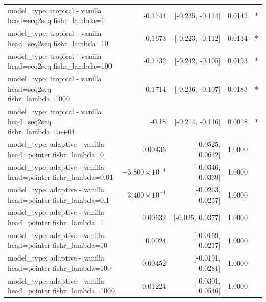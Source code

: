 \documentclass[10pt]{article}
\makeatletter
\newcommand{\stackcell}[1]{\begin{tabular}[t]{@{}l@{}}#1\end{tabular}}
\makeatother
\begin{document}
{\begin{longtable}{lrrrl}
\stackcell{model\_type: tropical - vanilla\\\footnotesize head=seq2seq fishr\_lambda=1 } & -0.1744 & [-0.235, -0.114] & 0.0142 & *\\
\stackcell{model\_type: tropical - vanilla\\\footnotesize head=seq2seq fishr\_lambda=10 } & -0.1673 & [-0.223, -0.112] & 0.0134 & *\\
\stackcell{model\_type: tropical - vanilla\\\footnotesize head=seq2seq fishr\_lambda=100 } & -0.1732 & [-0.242, -0.105] & 0.0193 & *\\
\stackcell{model\_type: tropical - vanilla\\\footnotesize head=seq2seq fishr\_lambda=1000 } & -0.1714 & [-0.236, -0.107] & 0.0183 & *\\
\stackcell{model\_type: tropical - vanilla\\\footnotesize head=seq2seq fishr\_lambda=1e+04 } & -0.18 & [-0.214, -0.146] & 0.0018 & *\\
\stackcell{model\_type: adaptive - vanilla\\\footnotesize head=pointer fishr\_lambda=0 } & 0.00436 & [-0.0525, 0.0612] & 1.0000 & \\
\stackcell{model\_type: adaptive - vanilla\\\footnotesize head=pointer fishr\_lambda=0.01 } & $-3.800\times10^{-4}$ & [-0.0346, 0.0339] & 1.0000 & \\
\stackcell{model\_type: adaptive - vanilla\\\footnotesize head=pointer fishr\_lambda=0.1 } & $-3.400\times10^{-4}$ & [-0.0263, 0.0257] & 1.0000 & \\
\stackcell{model\_type: adaptive - vanilla\\\footnotesize head=pointer fishr\_lambda=1 } & 0.00632 & [-0.025, 0.0377] & 1.0000 & \\
\stackcell{model\_type: adaptive - vanilla\\\footnotesize head=pointer fishr\_lambda=10 } & 0.0024 & [-0.0169, 0.0217] & 1.0000 & \\
\stackcell{model\_type: adaptive - vanilla\\\footnotesize head=pointer fishr\_lambda=100 } & 0.00452 & [-0.0191, 0.0281] & 1.0000 & \\
\stackcell{model\_type: adaptive - vanilla\\\footnotesize head=pointer fishr\_lambda=1000 } & 0.01224 & [-0.0301, 0.0546] & 1.0000 & \\

\end{longtable}}
\end{document}

